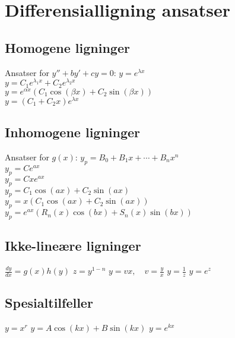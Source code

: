 \documentclass[a4paper,7pt,fleqn]{article}
\begin{document}
\begin{minipage}{\linewidth}

\section{Differensialligning ansatser}

\subsection{Homogene ligninger }
Ansatser for  \( y'' + by' + cy = 0 \):
\( y = e^{\lambda x} \)\\
\( y = C_1 e^{\lambda_1 x} + C_2 e^{\lambda_2 x} \)\\
\( y = e^{\alpha x}(C_1 \cos(\beta x) + C_2 \sin(\beta x)) \)\\
\( y = (C_1 + C_2 x)e^{\lambda x} \)\\


\subsection{Inhomogene ligninger}
Ansatser for \( g(x) \):
\( y_p = B_0 + B_1x + \cdots + B_nx^n \)\\
\( y_p = Ce^{ax} \) \\
\( y_p = Cxe^{ax} \)\\
\( y_p = C_1 \cos(ax) + C_2 \sin(ax) \) \\
\( y_p = x(C_1 \cos(ax) + C_2 \sin(ax)) \)\\
\( y_p = e^{ax}(R_n(x)\cos(bx) + S_n(x)\sin(bx)) \)\\


\subsection{Ikke-lineære ligninger}
\( \frac{dy}{dx} = g(x)h(y) \)
\( z = y^{1-n} \)
\( y = vx, \quad v = \frac{y}{x} \)
\( y = \frac{1}{z} \)
\( y = e^z \)

\subsection{Spesialtilfeller}
\( y = x^r \)
\( y = A\cos(kx) + B\sin(kx) \)
\( y = e^{kx} \)
\end{minipage}


\newpage
\end{document}
